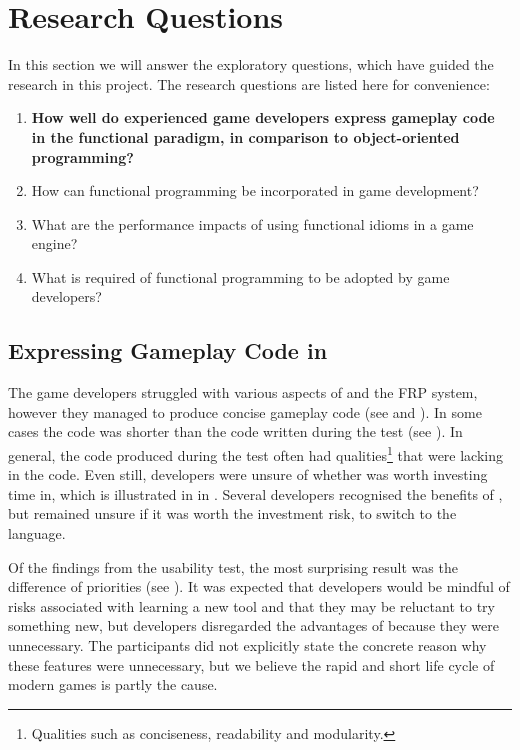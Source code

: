 \section{Research Questions}
In this section we will answer the exploratory questions, which have guided the research in this project. The research questions are listed here for convenience:
\begin{center}
    \begin{enumerate}
        \item \textbf{How well do experienced game developers express gameplay code in the functional paradigm, in comparison to object-oriented programming?}
        \item How can functional programming be incorporated in game development?
        \item What are the performance impacts of using functional idioms in a game engine?
        \item What is required of functional programming to be adopted by game developers?
    \end{enumerate}
\end{center}

\subsection{Expressing Gameplay Code in \fs}
The game developers struggled with various aspects of \fs and the \gls{FRP} system, however they managed to produce concise gameplay code (see  and ). In some cases the \fs code was shorter than the \cs code written during the test (see ). In general, the \fs code produced during the test often had qualities\footnote{Qualities such as conciseness, readability and modularity.} that were lacking in the \cs code. Even still, developers were unsure of whether \fs was worth investing time in, which is illustrated in in . Several developers recognised the benefits of \fs, but remained unsure if it was worth the investment risk, to switch to the language.

Of the findings from the usability test, the most surprising result was the difference of priorities (see ). It was expected that developers would be mindful of risks associated with learning a new tool and that they may be reluctant to try something new, but developers disregarded the advantages of \fs because they were unnecessary. The participants did not explicitly state the concrete reason why these features were unnecessary, but we believe the rapid and short life cycle of modern games is partly the cause.

